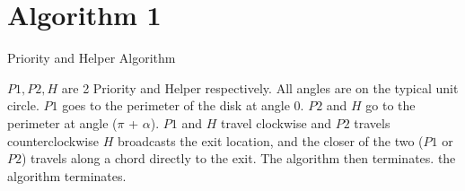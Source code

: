 \documentclass[11pt]{amsart}
\begin{document}
\section{Algorithm 1}


\begin{algorithm}
  \caption{Priority and Helper Algorithm}
  \begin{algorithmic}[1]
      \State $P1, P2, H$ are 2 Priority and Helper respectively.
      \State All angles are on the typical unit circle.
      \State $P1$ goes to the perimeter of the disk at angle 0.
      \State $P2$ and $H$ go to the perimeter at angle ($\pi$ + $\alpha$).
      \Repeat $P1$ and $H$ travel clockwise and $P2$ travels counterclockwise 
       $H$ broadcasts the exit location, and the closer of the
      two ($P1$ or $P2$) travels along a chord directly to the exit. The algorithm then terminates. \EndIf
       the algorithm terminates. \EndIf
    \EndProcedure
  \end{algorithmic}
\end{algorithm}
\end{document}

